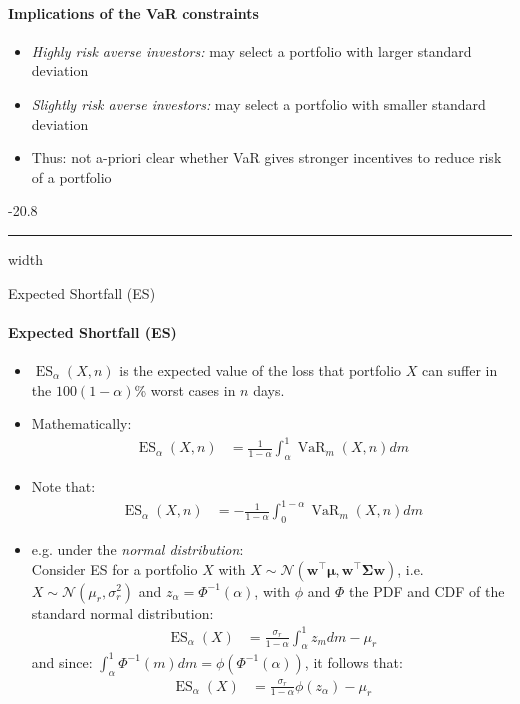 \documentclass[a4paper,landscape,8pt,fleqn]{scrartcl}
\makeatletter
\renewcommand{\subsubsection}{\@startsection{subsubsection}{1}{0mm}%
{-2\baselineskip}{0.8\baselineskip}%
{\hrule depth 0.2pt width\columnwidth\vspace*{1.2em}\normalsize\bfseries}}
\DeclareMathOperator{\VaR}{VaR}				%
\DeclareMathOperator{\ES}{ES}					%
\makeatother
\begin{document}
\begin{multicols*}{3}
\paragraph{Implications of the VaR constraints}
\begin{itemize}
\item \textit{Highly risk averse investors:} may select a portfolio with larger standard deviation
\item \textit{Slightly risk averse investors:} may select a portfolio with smaller standard deviation
\item Thus: not a-priori clear whether VaR gives stronger incentives to reduce risk of a portfolio
\end{itemize}

\subsubsection{Expected Shortfall (ES)}

\paragraph{Expected Shortfall (ES)}
\begin{itemize}
\item $\ES_\alpha(X,n)$ is the expected value of the loss that portfolio $X$ can suffer in the $100(1-\alpha)$\% worst cases in $n$ days.
\item Mathematically:
\begin{align*}
\ES_\alpha(X,n) &= \frac{1}{1-\alpha} \int_\alpha^1 \VaR_m(X,n) dm
\end{align*}
\item Note that:
\begin{align*}
\ES_\alpha(X,n) &= -\frac{1}{1-\alpha} \int_0^{1-\alpha} \VaR_m(X,n) dm
\end{align*}
\item e.g. under the \textit{normal distribution}: \\
Consider ES for a portfolio $X$ with $X \sim \mathcal{N}(\bm w^\top \bm \mu, \bm w^\top \bm \Sigma \bm w)$, i.e. $X \sim \mathcal{N}(\mu_r, \sigma_r^2)$ and $z_\alpha = \Phi^{-1}(\alpha)$, with $\phi$ and $\Phi$ the PDF and CDF of the standard normal distribution:
\begin{align*}
\ES_\alpha(X) &= \frac{\sigma_r}{1-\alpha} \int_\alpha^1 z_m dm - \mu_r
\end{align*}
and since: $\int_\alpha^1 \Phi^{-1}(m) dm = \phi(\Phi^{-1}(\alpha))$, it follows that:
\begin{align*}
\ES_\alpha(X) &= \frac{\sigma_r}{1-\alpha} \phi(z_\alpha) - \mu_r
\end{align*}
\end{itemize}


\end{multicols*}
\end{document}
